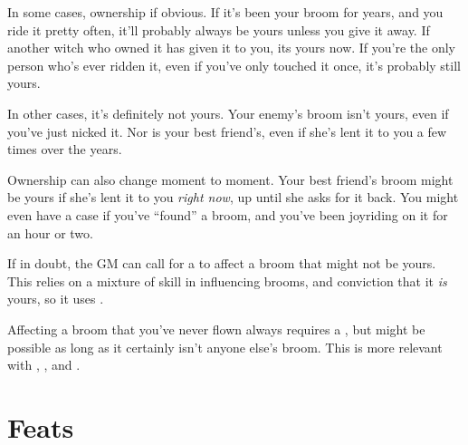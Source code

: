 In some cases, ownership if obvious.
If it's been your broom for years, and you ride it pretty often, it'll probably always be yours unless you give it away.
If another witch who owned it has given it to you, its yours now.
If you're the only person who's ever ridden it, even if you've only touched it once, it's probably still yours.

In other cases, it's definitely not yours.
Your enemy's broom isn't yours, even if you've just nicked it.
Nor is your best friend's, even if she's lent it to you a few times over the years.

Ownership can also change moment to moment.
Your best friend's broom might be yours if she's lent it to you \emph{right now}, up until she asks for it back.
You might even have a case if you've ``found'' a broom, and you've been joyriding on it for an hour or two.

If in doubt, the GM can call for a {\test} to affect a broom that might not be yours.
This relies on a mixture of skill in influencing brooms, and conviction that it \emph{is} yours, so it uses .

Affecting a broom that you've never flown always requires a {\test}, but might be possible as long as it certainly isn't anyone else's broom.
This is more relevant with , , and .

\section{Feats}



